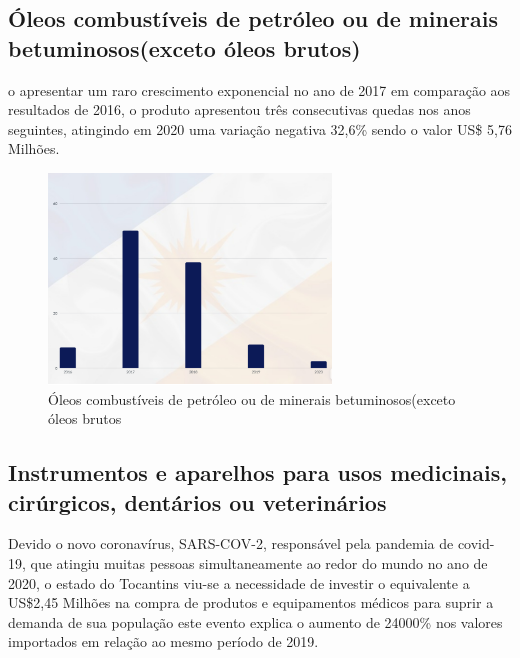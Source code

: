 \newpage 

\subsection {Óleos combustíveis de petróleo ou de minerais betuminosos(exceto óleos brutos)}
\par o apresentar um raro crescimento exponencial no ano de 2017 em comparação aos resultados de 2016, o produto apresentou três consecutivas quedas nos anos seguintes, atingindo em 2020 uma variação negativa 32,6\% sendo o valor US\$ 5,76 Milhões.

\begin{figure} [h] \caption{Óleos combustíveis de petróleo ou de minerais betuminosos(exceto óleos brutos}
	\includegraphics[width=\linewidth]{fig/oleo.png}
\end{figure}

\newpage

\subsection {Instrumentos e aparelhos para usos medicinais, cirúrgicos, dentários ou veterinários}
\par Devido o novo coronavírus, SARS-COV-2, responsável pela pandemia de covid-19, que atingiu muitas pessoas simultaneamente ao redor do mundo no ano de 2020, o estado do Tocantins viu-se a necessidade de investir o equivalente a US\$2,45 Milhões na compra de produtos e equipamentos médicos para suprir a demanda de sua população este evento explica o aumento de 24000\% nos valores importados em relação ao mesmo período de 2019.

